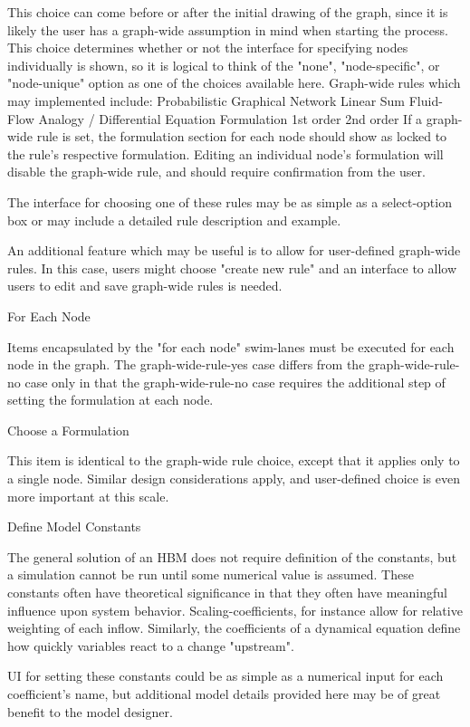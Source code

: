 This choice can come before or after the initial drawing of the graph, since it is likely the user has a graph-wide assumption in mind when starting the process. This choice determines whether or not the interface for specifying nodes individually is shown, so it is logical to think of the "none", "node-specific", or "node-unique" option as one of the choices available here. Graph-wide rules which may implemented include:
Probabilistic Graphical Network
Linear Sum
Fluid-Flow Analogy / Differential Equation Formulation 
1st order
2nd order
If a graph-wide rule is set, the formulation section for each node should show as locked to the rule's respective formulation. Editing an individual node's formulation will disable the graph-wide rule, and should require confirmation from the user. 

The interface for choosing one of these rules may be as simple as a select-option box or may include a detailed rule description and example. 

An additional feature which may be useful is to allow for user-defined graph-wide rules. In this case, users might choose "create new rule" and an interface to allow users to edit and save graph-wide rules is needed.

For Each Node

Items encapsulated by the "for each node" swim-lanes must be executed for each node in the graph. The graph-wide-rule-yes case differs from the graph-wide-rule-no case only in that the graph-wide-rule-no case requires the additional step of setting the formulation at each node.

Choose a Formulation

This item is identical to the graph-wide rule choice, except that it applies only to a single node. Similar design considerations apply, and user-defined choice is even more important at this scale.

Define Model Constants

The general solution of an HBM does not require definition of the constants, but a simulation cannot be run until some numerical value is assumed. These constants often have theoretical significance in that they often have meaningful influence upon system behavior. Scaling-coefficients, for instance allow for relative weighting of each inflow. Similarly, the coefficients of a dynamical equation define how quickly variables react to a change "upstream". 

UI for setting these constants could be as simple as a numerical input for each coefficient's name, but additional model details provided here may be of great benefit to the model designer. 

